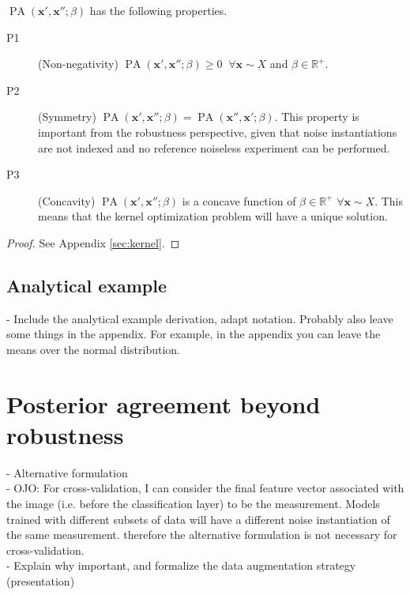 \begin{theorem}
    $\operatorname{PA}\left(\bm{x}', \bm{x}'' ; \beta\right)$ has the following properties.

    \begin{description}
        \item[P1](Non-negativity) $\operatorname{PA}\left(\bm{x}', \bm{x}'' ; \beta\right) \geq 0 \;\; \forall \bm{x} \sim \underbar{X}$ and $\beta \in \mathbb{R}^+$.
        \item[P2](Symmetry)  $\operatorname{PA}\left(\bm{x}', \bm{x}'' ; \beta\right) = \operatorname{PA}\left(\bm{x}'', \bm{x}'; \beta\right)$. This property is 
        important from the robustness perspective, given that noise
        instantiations are not indexed and no reference noiseless experiment can be performed.
        \item[P3](Concavity) $\operatorname{PA}\left(\bm{x}', \bm{x}'' ; \beta\right)$ is a concave function of $\beta \in \mathbb{R}^+$ $\forall \bm{x} \sim \underbar{X}$. This means that 
        the kernel optimization problem will have a unique solution.
    \end{description}
\end{theorem}

\begin{proof}
    See Appendix \ref{sec:kernel}.
\end{proof}

\subsection{Analytical example}

- Include the analytical example derivation, adapt notation. Probably also leave
some things in the appendix. For example, in the appendix you can leave the means
over the normal distribution.


\section{Posterior agreement beyond robustness}

- Alternative formulation \\
- OJO: For cross-validation, I can consider the final feature vector associated with the image
(i.e. before the classification layer) to be the measurement. Models trained with different
subsets of data will have a different noise instantiation of the same measurement. therefore
the alternative formulation is not necessary for cross-validation. \\
- Explain why important, and formalize the data augmentation strategy (presentation) \\

